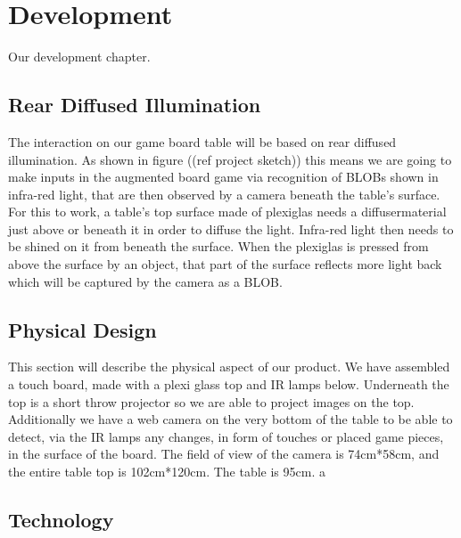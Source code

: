 \chapter{Development}\label{ch:development}
Our development chapter. 

\section{Rear Diffused Illumination}
The interaction on our game board table will be based on rear diffused illumination.\citep{multiTT} As shown in figure ((ref project sketch)) this means we are going to make inputs in the augmented board game via recognition of BLOBs shown in infra-red light, that are then observed by a camera beneath the table's surface. 
For this to work, a table's top surface made of plexiglas needs a diffusermaterial just above or beneath it in order to diffuse the light. Infra-red light then needs to be shined on it from beneath the surface. When the plexiglas is pressed from above the surface by an object, that part of the surface reflects more light back which will be captured by the camera as a BLOB.

\section{Physical Design} 
This section will describe the physical aspect of our product.
We have assembled a touch board, made with a plexi glass top and IR lamps below. Underneath the top is a short throw projector so we are able to project images on the top. Additionally we have a web camera on the very bottom of the table to be able to detect, via the IR lamps any changes, in form of touches or placed game pieces, in the surface of the board. 
The field of view of the camera is 74cm*58cm, and the entire table top is 102cm*120cm. The table is 95cm. 
a

\section{Technology}

